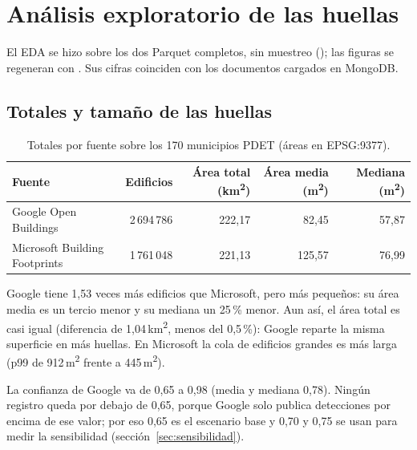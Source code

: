 \section{Análisis exploratorio de las huellas}
\label{sec:eda}

El EDA se hizo sobre los dos Parquet completos, sin muestreo
(); las figuras se regeneran con
. Sus cifras coinciden con los documentos
cargados en MongoDB.

\subsection{Totales y tamaño de las huellas}

\begin{table}[H]
\centering\small
\caption{Totales por fuente sobre los 170 municipios PDET (áreas en EPSG:9377).}
\label{tab:eda-totales}
\begin{tabularx}{\textwidth}{@{}Lrrrr@{}}
\toprule
\textbf{Fuente} & \textbf{Edificios} & \textbf{Área total (km\textsuperscript{2})} & \textbf{Área media (m\textsuperscript{2})} & \textbf{Mediana (m\textsuperscript{2})} \\
\midrule
Google Open Buildings & 2\,694\,786 & 222,17 & 82,45 & 57,87 \\
Microsoft Building Footprints & 1\,761\,048 & 221,13 & 125,57 & 76,99 \\
\bottomrule
\end{tabularx}
\end{table}

Google tiene 1,53 veces más edificios que Microsoft, pero más pequeños: su área
media es un tercio menor y su mediana un 25\,\% menor. Aun así, el área total
es casi igual (diferencia de 1,04\,km\textsuperscript{2}, menos del 0,5\,\%):
Google reparte la misma superficie en más huellas. En Microsoft la cola de
edificios grandes es más larga (p99 de 912\,m\textsuperscript{2} frente a
445\,m\textsuperscript{2}).


La confianza de Google va de 0,65 a 0,98 (media y mediana 0,78). Ningún
registro queda por debajo de 0,65, porque Google solo publica detecciones por
encima de ese valor; por eso 0,65 es el escenario base y 0,70 y 0,75 se usan
para medir la sensibilidad (sección~\ref{sec:sensibilidad}).

